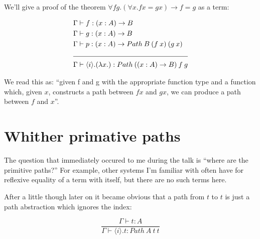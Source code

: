 \documentclass[a4paper]{article}
\newcommand{\fun}[3]{(#1 : #2) \rightarrow #3}
\newcommand{\labs}[2]{(\lambda #1 . #2)}
\newcommand{\lapp}[2]{(#1 \: #2)}
\newcommand{\pabs}[2]{{\langle #1 \rangle}.{#2}}
\newcommand{\Path}[3]{{Path\:{#1}\:{#2}\:{#3}}}
\begin{document}
We'll give a proof of the theorem $\forall f g. (\forall x. f x = g x) \rightarrow f = g$
as a term:

\begin{align}
  \Gamma &\vdash f : \fun{x}{A}{B} \\
  \Gamma &\vdash g : \fun{x}{A}{B} \\
  \Gamma &\vdash p : \fun{x}{A}{\Path{B}{\lapp{f}{x}}{\lapp{g}{x}}} \\
  \cline{1-2}
  \Gamma &\vdash \pabs{i}{\labs{x}{
  }} : \Path{(\fun{x}{A}{B})}{f}{g}
\end{align}

We read this as: ``given f and g with the appropriate function type
and a function which, given $x$, constructs a path between $f x$ and
$g x$, we can produce a path between $f$ and $x$''.

\section{Whither primative paths}

The question that immediately occured to me during the talk is ``where
are the primitive paths?'' For example, other systems I'm familiar
with often have for reflexive equality of a term with itself, but
there are no such terms here.

After a little though later on it became obvious that a path from $t$
to $t$ is just a path abstraction which ignores the index:

$$
\frac{\Gamma \vdash t : A}{\Gamma \vdash \pabs{i}{t} : \Path{A}{t}{t}}
$$


{}

\end{document}
